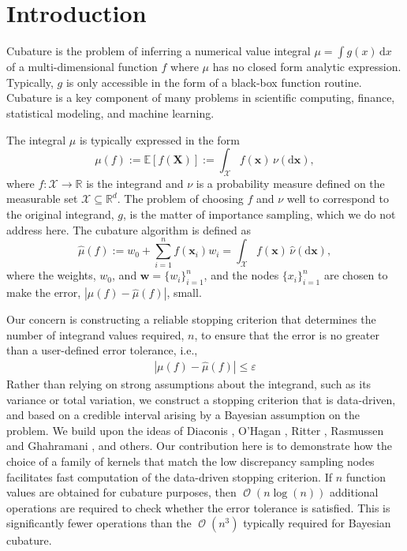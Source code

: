 \documentclass[smallextended]{svjour3}       %
\DeclareMathOperator{\Order}{{\mathcal O}}
\newcommand{\bm}[1]{\boldsymbol{#1}}
\newcommand{\dif}[1]{\text{d}{#1}}
\newcommand{\reals}{\mathbb{R}}
\newcommand{\Ex}{\mathbb{E}}
\newcommand{\cx}{\mathcal{X}}
\newcommand{\vw}{\bm{w}}
\newcommand{\vx}{\bm{x}}
\newcommand{\hmu}{\hat{\mu}}
\newcommand{\errtol}{\varepsilon}
\def\abs#1{\ensuremath{\left \lvert #1 \right \rvert}}
\begin{document}
\section{Introduction}
\label{intro}
Cubature is the problem of inferring a numerical value integral 
$\mu = \int g(x) \, \dif x$ of a multi-dimensional function $f$ where $\mu$ has no closed form analytic expression. Typically, $g$ is only accessible in the form of a black-box function routine. 
Cubature is a key component of many problems in scientific computing, finance, statistical modeling, and machine learning.  




The integral $\mu$ is typically expressed in the form
\begin{equation}
\label{eqn:defn_mu}
\mu(f) := \Ex[f(\bm{X})] := \int_{\mathcal{X}} f(\vx)\, \nu(\dif\vx),
\end{equation}
where $f:\cx \to \reals$ is the integrand and $\nu$ is a probability measure defined on the measurable set $\cx \subseteq \reals^d$.  The problem of choosing $f$ and $\nu$ well to correspond to the original integrand, $g$, is the matter of importance sampling, which we do not address here.  The cubature algorithm is defined as
\begin{equation}
\label{eqn:defn_hmu}  %
\hmu(f) := w_0 + \sum_{i=1}^{n} f(\vx_i) w_i = \int_{\mathcal{X}} f(\vx)\, \hat{\nu}(\dif\vx),
\end{equation}
where the weights, $w_0$, and  $\vw = \{w_i\}_{i=1}^n$, and the nodes $\{x_i\}_{i=1}^n$ are chosen to make the error, $\abs{\mu(f) - \hmu(f)}$, small.

Our concern is constructing a reliable stopping criterion that determines the number of integrand values required, $n$, to ensure that the error is no greater than a user-defined error tolerance, i.e., 
\begin{align}
\label{eqn:err_crit} 
\abs{\mu(f) - \hmu(f)} \leq \errtol 
\end{align}
Rather than relying on strong assumptions about the integrand, such as its variance or total variation, we construct a stopping criterion that is data-driven, and based on a credible interval arising by a Bayesian assumption on the problem.  We build upon the ideas of Diaconis \cite{DiaconisBayesian}, O'Hagan \cite{HagenBayes}, Ritter \cite{RiterAverage}, Rasmussen and Ghahramani \cite{RasmussenBayesian}, and others.  Our contribution here is to demonstrate how the choice of a family of kernels that match the low discrepancy sampling nodes facilitates fast computation of the data-driven stopping criterion.  If $n$ function values are obtained for cubature purposes, then $\Order(n \log(n))$ additional operations are required to check whether the error tolerance is satisfied.  This is significantly fewer operations than the $\Order(n^3)$ typically required for Bayesian cubature.
\end{document}
